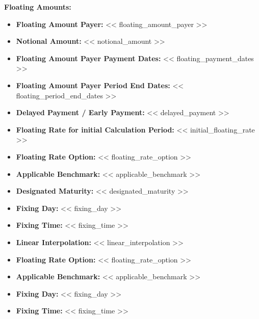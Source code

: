 \documentclass[11pt, a4paper]{article}
\newcommand{\templatetag}[1]{} %
\begin{document}
\vspace{0.15cm}
\noindent \textbf{Floating Amounts:}
\begin{itemize}[leftmargin=2cm, label={}, itemsep=1pt]
    \item \textbf{Floating Amount Payer:} << floating_amount_payer >>
    \item \textbf{Notional Amount:} << notional_amount >>
    \item \textbf{Floating Amount Payer Payment Dates:} << floating_payment_dates >>
    \item \textbf{Floating Amount Payer Period End Dates:} << floating_period_end_dates >>
\templatetag{<<- if delayed_payment >>}
    \item \textbf{Delayed Payment / Early Payment:} << delayed_payment >>
\templatetag{<<- endif >>}

\templatetag{<<- if model_type == 'I' >>}
\templatetag{<<- if initial_floating_rate >>}
    \item \textbf{Floating Rate for initial Calculation Period:} << initial_floating_rate >>
\templatetag{<<- endif >>}
    \item \textbf{Floating Rate Option:} << floating_rate_option >>
\templatetag{<<- if applicable_benchmark >>}
    \item \textbf{Applicable Benchmark:} << applicable_benchmark >>
\templatetag{<<- endif >>}
    \item \textbf{Designated Maturity:} << designated_maturity >>
\templatetag{<<- if fixing_day >>}
    \item \textbf{Fixing Day:} << fixing_day >>
\templatetag{<<- endif >>}
\templatetag{<<- if fixing_time >>}
    \item \textbf{Fixing Time:} << fixing_time >>
\templatetag{<<- endif >>}
\templatetag{<<- if linear_interpolation >>}
    \item \textbf{Linear Interpolation:} << linear_interpolation >>
\templatetag{<<- endif >>}
\templatetag{<<- endif >>}

\templatetag{<<- if model_type == 'II' >>}
    \item \textbf{Floating Rate Option:} << floating_rate_option >>
\templatetag{<<- if applicable_benchmark >>}
    \item \textbf{Applicable Benchmark:} << applicable_benchmark >>
\templatetag{<<- endif >>}
\templatetag{<<- if fixing_day >>}
    \item \textbf{Fixing Day:} << fixing_day >>
\templatetag{<<- endif >>}
\templatetag{<<- if fixing_time >>}
    \item \textbf{Fixing Time:} << fixing_time >>
\templatetag{<<- endif >>}
\templatetag{<<- endif >>}


\end{itemize}
\end{document}
